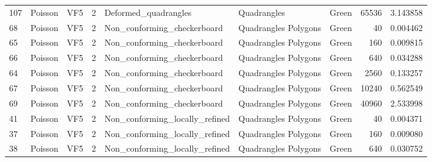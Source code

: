 \begin{tabular}{lllrlllrr}
107 &           Poisson &                            VF5 &               2 &            Deformed\_quadrangles &            Quadrangles  &                                Green &                    65536 &                         3.143858 \\
68  &           Poisson &                            VF5 &               2 &     Non\_conforming\_checkerboard &   Quadrangles Polygons  &                                Green &                       40 &                         0.004462 \\
65  &           Poisson &                            VF5 &               2 &     Non\_conforming\_checkerboard &   Quadrangles Polygons  &                                Green &                      160 &                         0.009815 \\
66  &           Poisson &                            VF5 &               2 &     Non\_conforming\_checkerboard &   Quadrangles Polygons  &                                Green &                      640 &                         0.034288 \\
64  &           Poisson &                            VF5 &               2 &     Non\_conforming\_checkerboard &   Quadrangles Polygons  &                                Green &                     2560 &                         0.133257 \\
67  &           Poisson &                            VF5 &               2 &     Non\_conforming\_checkerboard &   Quadrangles Polygons  &                                Green &                    10240 &                         0.562549 \\
69  &           Poisson &                            VF5 &               2 &     Non\_conforming\_checkerboard &   Quadrangles Polygons  &                                Green &                    40960 &                         2.533998 \\
41  &           Poisson &                            VF5 &               2 &  Non\_conforming\_locally\_refined &   Quadrangles Polygons  &                                Green &                       40 &                         0.004371 \\
37  &           Poisson &                            VF5 &               2 &  Non\_conforming\_locally\_refined &   Quadrangles Polygons  &                                Green &                      160 &                         0.009080 \\
38  &           Poisson &                            VF5 &               2 &  Non\_conforming\_locally\_refined &   Quadrangles Polygons  &                                Green &                      640 &                         0.030752 \\

\end{tabular}
